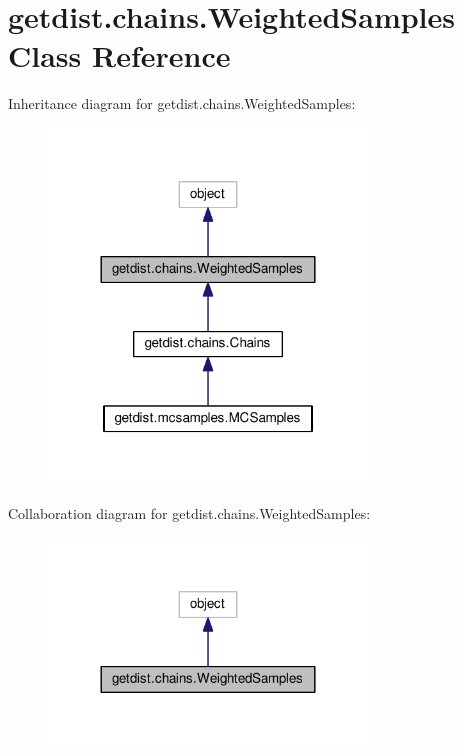 \hypertarget{classgetdist_1_1chains_1_1WeightedSamples}{}\section{getdist.\+chains.\+Weighted\+Samples Class Reference}
\label{classgetdist_1_1chains_1_1WeightedSamples}


Inheritance diagram for getdist.\+chains.\+Weighted\+Samples\+:
\nopagebreak
\begin{figure}[H]
\begin{center}
\leavevmode
\includegraphics[width=240pt]{classgetdist_1_1chains_1_1WeightedSamples__inherit__graph}
\end{center}
\end{figure}


Collaboration diagram for getdist.\+chains.\+Weighted\+Samples\+:
\nopagebreak
\begin{figure}[H]
\begin{center}
\leavevmode
\includegraphics[width=240pt]{classgetdist_1_1chains_1_1WeightedSamples__coll__graph}
\end{center}
\end{figure}
